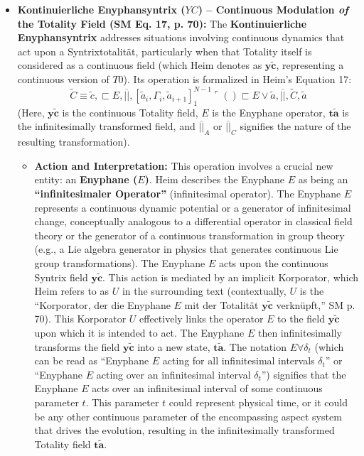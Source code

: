 \documentclass[12pt]{article}
\newcommand{\q}[1]{\enquote{#1}}
\newcommand{\syntrixtotalitaet}{T0}
\newcommand{\kontinuierlicheEnyphansyntrix}{YC}
\newcommand{\enyphane}{E}
\begin{document}
\begin{itemize}
    \item \textbf{Kontinuierliche Enyphansyntrix (\( \kontinuierlicheEnyphansyntrix \)) – Continuous Modulation \textit{of} the Totality Field (SM Eq. 17, p. 70):}
    The \textbf{Kontinuierliche Enyphansyntrix} addresses situations involving continuous dynamics that act upon a Syntrixtotalität, particularly when that Totality itself is considered as a continuous field (which Heim denotes as \( \mathbf{y\widetilde{c}} \), representing a continuous version of \( \syntrixtotalitaet \)). Its operation is formalized in Heim's Equation 17:
    \begin{equation}
    \widetilde{C} \equiv \widetilde{c}, \sqsubset E, \overline{||}, [\widetilde{a}_i, \Gamma_i, \widetilde{a}_{i+1}]_{1}^{N-1} \ulcorner( ) \sqsubset E \vee \widetilde{a}, \overline{||}, \widetilde{C}, \widetilde{a}
    \label{eq:original_kontinuierliche_enyphansyntrix_alt}
    \end{equation}
    (Here, \( \mathbf{y\widetilde{c}} \) is the continuous Totality field, \( \enyphane \) is the Enyphane operator, \( \mathbf{t\widetilde{a}} \) is the infinitesimally transformed field, and \( \overline{||}_A \) or \( \overline{||}_C \) signifies the nature of the resulting transformation).
    \begin{itemize}
        \item \textbf{Action and Interpretation:} This operation involves a crucial new entity: an \textbf{Enyphane (\( \enyphane \))}. Heim describes the Enyphane \( \enyphane \) as being an \textbf{\q{infinitesimaler Operator}} (infinitesimal operator). The Enyphane \( \enyphane \) represents a continuous dynamic potential or a generator of infinitesimal change, conceptually analogous to a differential operator in classical field theory or the generator of a continuous transformation in group theory (e.g., a Lie algebra generator in physics that generates continuous Lie group transformations). The Enyphane \( \enyphane \) acts upon the continuous Syntrix field \( \mathbf{y\widetilde{c}} \). This action is mediated by an implicit Korporator, which Heim refers to as \( U \) in the surrounding text (contextually, \( U \) is the \q{Korporator, der die Enyphane \( \enyphane \) mit der Totalität \( \mathbf{y\widetilde{c}} \) verknüpft,} SM p. 70). This Korporator \(U\) effectively links the operator \( \enyphane \) to the field \( \mathbf{y\widetilde{c}} \) upon which it is intended to act. The Enyphane \( \enyphane \) then infinitesimally transforms the field \( \mathbf{y\widetilde{c}} \) into a new state, \( \mathbf{t\widetilde{a}} \). The notation \( \enyphane\forall\delta_t \) (which can be read as \q{Enyphane \( \enyphane \) acting for all infinitesimal intervals \( \delta_t \)} or \q{Enyphane \( \enyphane \) acting over an infinitesimal interval \( \delta_t \)}) signifies that the Enyphane \( \enyphane \) acts over an infinitesimal interval of some continuous parameter \( t \). This parameter \( t \) could represent physical time, or it could be any other continuous parameter of the encompassing aspect system that drives the evolution, resulting in the infinitesimally transformed Totality field \( \mathbf{t\widetilde{a}} \).

\end{itemize}
\end{itemize}
\end{document}
